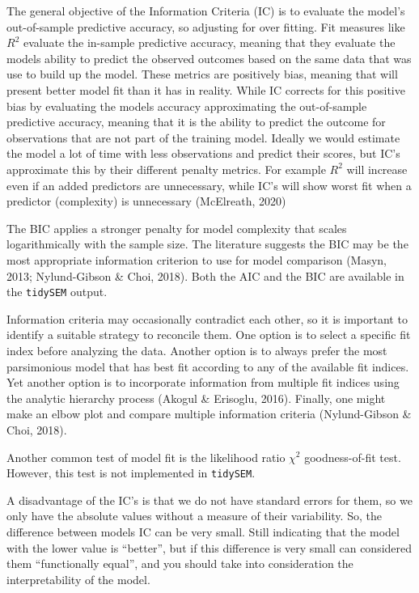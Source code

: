 \documentclass[
  ,man,floatsintext]{apa6}
\begin{document}
The general objective of the Information Criteria (IC) is to evaluate the model's out-of-sample predictive accuracy, so adjusting for over fitting. Fit measures like \(R^2\) evaluate the in-sample predictive accuracy, meaning that they evaluate the models ability to predict the observed outcomes based on the same data that was use to build up the model. These metrics are positively bias, meaning that will present better model fit than it has in reality. While IC corrects for this positive bias by evaluating the models accuracy approximating the out-of-sample predictive accuracy, meaning that it is the ability to predict the outcome for observations that are not part of the training model. Ideally we would estimate the model a lot of time with less observations and predict their scores, but IC's approximate this by their different penalty metrics. For example \(R^2\) will increase even if an added predictors are unnecessary, while IC's will show worst fit when a predictor (complexity) is unnecessary (McElreath, 2020)

The BIC applies a stronger penalty for model complexity that
scales logarithmically with the sample size. The literature suggests the
BIC may be the most appropriate information criterion to use for model
comparison (Masyn, 2013; Nylund-Gibson \& Choi, 2018). Both the AIC and the BIC are
available in the \texttt{tidySEM} output.

Information criteria may occasionally contradict each other, so it is
important to identify a suitable strategy to reconcile them. One option
is to select a specific fit index before analyzing the data. Another
option is to always prefer the most parsimonious model that has best fit
according to any of the available fit indices. Yet another option is to
incorporate information from multiple fit indices using the analytic
hierarchy process (Akogul \& Erisoglu, 2016). Finally, one might make an
elbow plot and compare multiple information criteria
(Nylund-Gibson \& Choi, 2018).

Another common test of model fit is the likelihood ratio \(\chi^2\)
goodness-of-fit test. However, this test is not implemented in
\texttt{tidySEM}.

A disadvantage of the IC's is that we do not have standard errors for them, so we only have the absolute values without a measure of their variability. So, the difference between models IC can be very small. Still indicating that the model with the lower value is ``better'', but if this difference is very small can considered them ``functionally equal'', and you should take into consideration the interpretability of the model.
\end{document}
